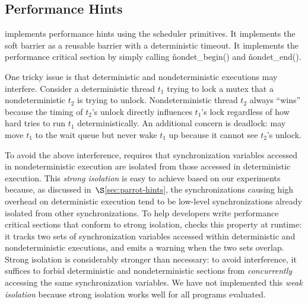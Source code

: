 
\subsection{Performance Hints} \label{sec:parrot-hints-impl}



\parrot implements performance hints using the scheduler primitives.  It
implements the soft barrier as a reusable barrier with a deterministic
timeout.  It implements the performance critical section by simply calling
\v{nondet\_begin()} and \v{nondet\_end()}.

One tricky issue is that deterministic and nondeterministic executions may
interfere.  Consider a deterministic thread $t_1$ trying to lock a mutex
that a nondeterministic $t_2$ is trying to unlock.
Nondeterministic thread $t_2$ always ``wins'' because the timing of
$t_2$'s unlock directly influences $t_1$'s lock regardless of how hard
\parrot tries to run $t_1$ deterministically.  An additional concern is
deadlock: \parrot may move $t_1$ to the wait queue but never wake $t_1$ up
because it cannot see  $t_2$'s unlock.

To avoid the above interference, \parrot requires that synchronization variables accessed
in nondeterministic execution are isolated from those accessed in
deterministic execution.  This \emph{strong isolation} is easy to achieve based
on our experiments because, as discussed in~$\S$\ref{sec:parrot-hints}, the
synchronizations causing high overhead on deterministic execution tend to
be low-level synchronizations already isolated from other
synchronizations. To help developers write performance critical sections
that conform to strong isolation, \parrot checks this property at runtime:
it tracks two sets of synchronization variables accessed within
deterministic and nondeterministic executions, and emits a warning when the
two sets overlap.  Strong isolation is considerably stronger than
necessary: to avoid interference, it suffices to forbid
deterministic and nondeterministic sections from \emph{concurrently}
accessing the same synchronization variables.  We have not implemented
this \emph{weak isolation} because strong isolation works well for all
programs evaluated.

